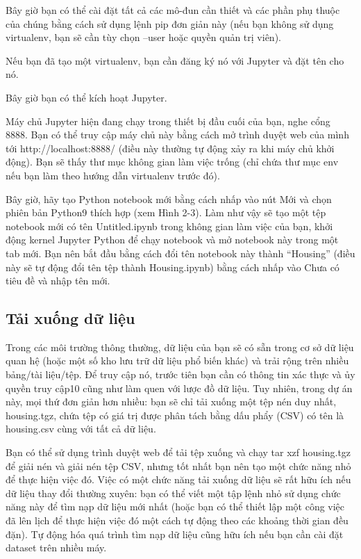 Bây giờ bạn có thể cài đặt tất cả các mô-đun cần thiết và các phần phụ thuộc của chúng bằng cách sử dụng lệnh pip đơn giản này (nếu bạn không sử dụng virtualenv, bạn sẽ cần tùy chọn --user hoặc quyền quản trị viên).

Nếu bạn đã tạo một virtualenv, bạn cần đăng ký nó với Jupyter và đặt tên cho nó.

Bây giờ bạn có thể kích hoạt Jupyter.

Máy chủ Jupyter hiện đang chạy trong thiết bị đầu cuối của bạn, nghe cổng 8888. Bạn có thể truy cập máy chủ này bằng cách mở trình duyệt web của mình tới http://localhost:8888/ (điều này thường tự động xảy ra khi máy chủ khởi động). Bạn sẽ thấy thư mục không gian làm việc trống (chỉ chứa thư mục env nếu bạn làm theo hướng dẫn virtualenv trước đó).

Bây giờ, hãy tạo Python notebook mới bằng cách nhấp vào nút Mới và chọn phiên bản Python9 thích hợp (xem Hình 2-3). Làm như vậy sẽ tạo một tệp notebook mới có tên Untitled.ipynb trong không gian làm việc của bạn, khởi động kernel Jupyter Python để chạy notebook và mở notebook này trong một tab mới. Bạn nên bắt đầu bằng cách đổi tên notebook này thành “Housing” (điều này sẽ tự động đổi tên tệp thành Housing.ipynb) bằng cách nhấp vào Chưa có tiêu đề và nhập tên mới.

\subsection{Tải xuống dữ liệu}

Trong các môi trường thông thường, dữ liệu của bạn sẽ có sẵn trong cơ sở dữ liệu quan hệ (hoặc một số kho lưu trữ dữ liệu phổ biến khác) và trải rộng trên nhiều bảng/tài liệu/tệp. Để truy cập nó, trước tiên bạn cần có thông tin xác thực và ủy quyền truy cập10 cũng như làm quen với lược đồ dữ liệu. Tuy nhiên, trong dự án này, mọi thứ đơn giản hơn nhiều: bạn sẽ chỉ tải xuống một tệp nén duy nhất, housing.tgz, chứa tệp có giá trị được phân tách bằng dấu phẩy (CSV) có tên là housing.csv cùng với tất cả dữ liệu.

Bạn có thể sử dụng trình duyệt web để tải tệp xuống và chạy tar xzf housing.tgz để giải nén và giải nén tệp CSV, nhưng tốt nhất bạn nên tạo một chức năng nhỏ để thực hiện việc đó. Việc có một chức năng tải xuống dữ liệu sẽ rất hữu ích nếu dữ liệu thay đổi thường xuyên: bạn có thể viết một tập lệnh nhỏ sử dụng chức năng này để tìm nạp dữ liệu mới nhất (hoặc bạn có thể thiết lập một công việc đã lên lịch để thực hiện việc đó một cách tự động theo các khoảng thời gian đều đặn). Tự động hóa quá trình tìm nạp dữ liệu cũng hữu ích nếu bạn cần cài đặt dataset trên nhiều máy.

